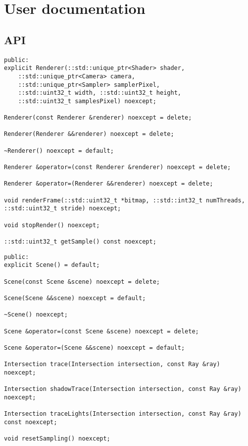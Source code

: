 \chapter{User documentation}

\section{API}

\par

\begin{lstlisting}[caption={Renderer API}, captionpos=b, label=API_Renderer]
public:
explicit Renderer(::std::unique_ptr<Shader> shader,
	::std::unique_ptr<Camera> camera,
	::std::unique_ptr<Sampler> samplerPixel,
	::std::uint32_t width, ::std::uint32_t height,
	::std::uint32_t samplesPixel) noexcept;

Renderer(const Renderer &renderer) noexcept = delete;

Renderer(Renderer &&renderer) noexcept = delete;

~Renderer() noexcept = default;

Renderer &operator=(const Renderer &renderer) noexcept = delete;

Renderer &operator=(Renderer &&renderer) noexcept = delete;

void renderFrame(::std::uint32_t *bitmap, ::std::int32_t numThreads, ::std::uint32_t stride) noexcept;

void stopRender() noexcept;

::std::uint32_t getSample() const noexcept;
\end{lstlisting}

\begin{lstlisting}[caption={Scene API}, captionpos=b, label=API_Scene]
public:
explicit Scene() = default;

Scene(const Scene &scene) noexcept = delete;

Scene(Scene &&scene) noexcept = default;

~Scene() noexcept;

Scene &operator=(const Scene &scene) noexcept = delete;

Scene &operator=(Scene &&scene) noexcept = default;

Intersection trace(Intersection intersection, const Ray &ray) noexcept;

Intersection shadowTrace(Intersection intersection, const Ray &ray) noexcept;

Intersection traceLights(Intersection intersection, const Ray &ray) const noexcept;

void resetSampling() noexcept;
\end{lstlisting}

